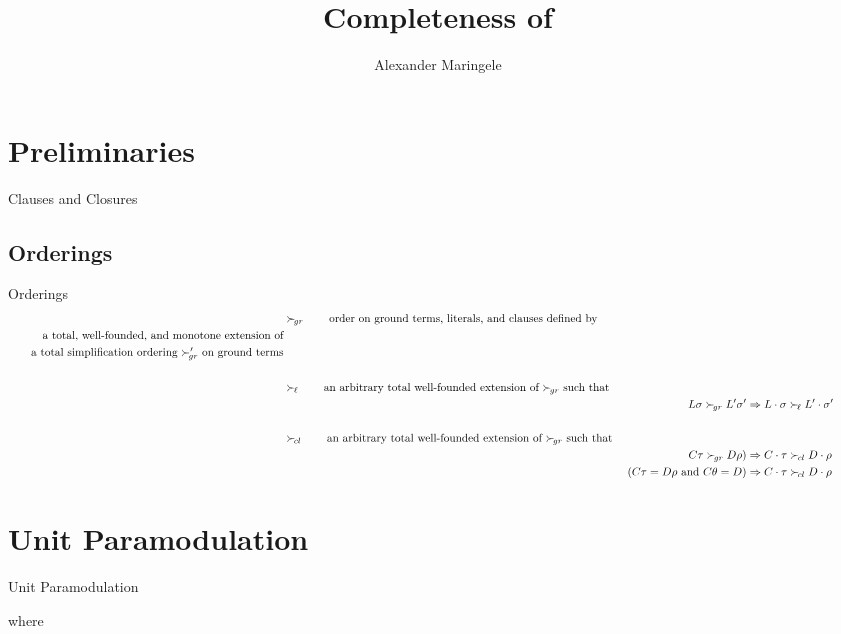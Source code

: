 \documentclass[%
handout,
]{beamer}
\title[Completeness]{Completeness of }
\author[{A$\ell$M}]{%
	Alexander Maringele
}
\institute[UIBK]{%
	{alexander.maringele@gmail.com}
}
\begin{document}
\titleframe

\begin{frame}
    \nocite{GK2004csl}
    
    
\end{frame}


\section{Preliminaries}


\begin{frame}{Clauses and Closures}

\end{frame}

\subsection{Orderings}
\begin{frame}{Orderings}
    \begin{align*}
        &\succG
        \tag*{order on ground terms, literals, and clauses defined by}
        \\
        \tag*{a total, well-founded, and monotone extension of}
        \\
        \tag*{a total simplification ordering $\succG'$ on ground terms}
        \\
        \\
        &\succL
        \tag*{an arbitrary total well-founded extension of $\succG$ such that}
        \\
        && L\sigma\succG L'\sigma' &\Rightarrow L\cdot\sigma\succL L'\cdot\sigma'\tag*{}
        \\
        \\
        &\succC \tag*{an arbitrary total well-founded extension of $\succG$ such that }
        \\
        && C\tau\succG D\rho\text)
        &\Rightarrow C\cdot\tau\succC D\cdot\rho   \tag*{}
        \\
        && (C\tau=D\rho\text{ and }C\theta = D)
        &\Rightarrow C\cdot\tau\succC D\cdot\rho   \tag*{}
    \end{align*}
\end{frame}

\section{Unit Paramodulation}
\begin{frame}{Unit Paramodulation}

    \begin{definition}
    
    where
    
    \end{definition}
\end{frame}
\end{document}
